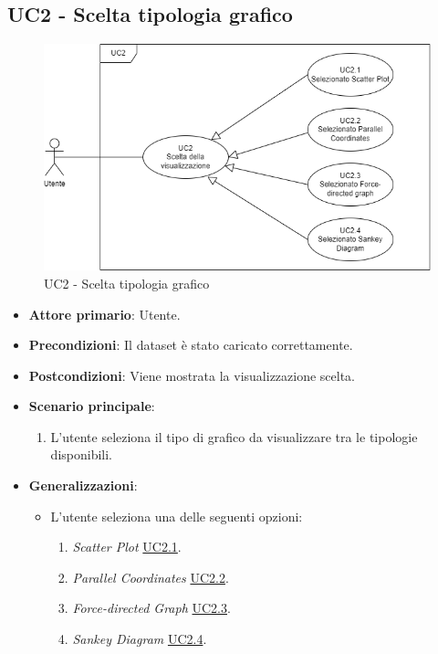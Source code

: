 
\subsection{UC2 - Scelta tipologia grafico}
\label{sec:UC2}
\begin{figure}[h!]
    \centering
    \includegraphics[scale=0.55]{../../assets/Selezione_tipo_grafico.png}
    \caption{UC2 - Scelta tipologia grafico}
\end{figure}
\begin{itemize}
    \item \textbf{Attore primario}: Utente.
    \item \textbf{Precondizioni}: Il dataset è stato caricato correttamente.
    \item \textbf{Postcondizioni}: Viene mostrata la visualizzazione scelta.
    \item \textbf{Scenario principale}:
          \begin{enumerate}
              \item L'utente seleziona il tipo di grafico da visualizzare tra le tipologie disponibili.
          \end{enumerate}
    \item \textbf{Generalizzazioni}:
    \begin{itemize}
        \item L'utente seleziona una delle seguenti opzioni:
                \begin{enumerate}
                    \item \textit{Scatter Plot} \hyperref[sec:UC2.1]{UC2.1}.
                    \item \textit{Parallel Coordinates} \hyperref[sec:UC2.2]{UC2.2}.
                    \item \textit{Force-directed Graph} \hyperref[sec:UC2.3]{UC2.3}.
                    \item \textit{Sankey Diagram} \hyperref[sec:UC2.4]{UC2.4}.
                \end{enumerate}
    \end{itemize} 
\end{itemize}

